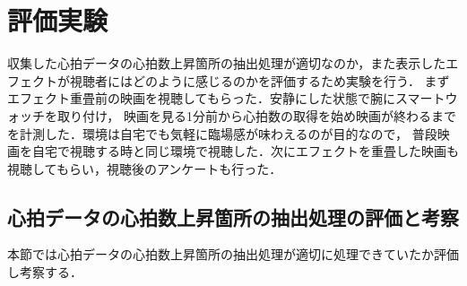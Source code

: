 \thispagestyle{myheadings}
\chapter{評価実験}

収集した心拍データの心拍数上昇箇所の抽出処理が適切なのか，また表示したエフェクトが視聴者にはどのように感じるのかを評価するため実験を行う．
まずエフェクト重畳前の映画を視聴してもらった．安静にした状態で腕にスマートウォッチを取り付け，
映画を見る1分前から心拍数の取得を始め映画が終わるまでを計測した．環境は自宅でも気軽に臨場感が味わえるのが目的なので，
普段映画を自宅で視聴する時と同じ環境で視聴した．次にエフェクトを重畳した映画も視聴してもらい，視聴後のアンケートも行った．

\section{心拍データの心拍数上昇箇所の抽出処理の評価と考察}
本節では心拍データの心拍数上昇箇所の抽出処理が適切に処理できていたか評価し考察する．

